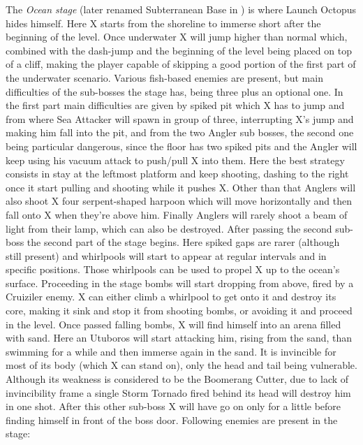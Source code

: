 The \textit{Ocean stage} (later renamed Subterranean Base in \mhx) is where Launch Octopus hides himself. Here X starts from the shoreline to immerse short after the beginning of the level. Once underwater X will jump higher than normal which, combined with the dash-jump and the beginning of the level being placed on top of a cliff, making the player capable of skipping a good portion of the first part of the underwater scenario\cite{stratwiki:Ocean}. Various fish-based enemies are present, but main difficulties of the sub-bosses the stage has, being three plus an optional one. In the first part main difficulties are given by spiked pit which X has to jump and from where Sea Attacker will spawn in group of three, interrupting X's jump and making him fall into the pit, and from the two Angler sub bosses, the second one being particular dangerous, since the floor has two spiked pits and the Angler will keep using his vacuum attack to push/pull X into them. Here the best strategy consists in stay at the leftmost platform and keep shooting, dashing to the right once it start pulling and shooting while it pushes X. Other than that Anglers will also shoot X four serpent-shaped harpoon which will move horizontally and then fall onto X when they're above him. Finally Anglers will rarely shoot a beam of light from their lamp, which can also be destroyed. After passing the second sub-boss the second part of the stage begins. Here spiked gaps are rarer (although still present) and whirlpools will start to appear at regular intervals and in specific positions. Those whirlpools can be used to propel X up to the ocean's surface. Proceeding in the stage bombs will start dropping from above, fired by a Cruiziler enemy. X can either climb a whirlpool to get onto it and destroy its core, making it sink and stop it from shooting bombs, or avoiding it and proceed in the level. Once passed falling bombs, X will find himself into an arena filled with sand. Here an Utuboros will start attacking him, rising from the sand, than swimming for a while and then immerse again in the sand. It is invincible for most of its body (which X can stand on), only the head and tail being vulnerable. Although its weakness is considered to be the Boomerang Cutter, due to lack of invincibility frame a single Storm Tornado fired behind its head will destroy him in one shot\cite{wiki:Utuboros}. After this other sub-boss X will have go on only for a little before finding himself in front of the boss door.
Following enemies are present in the stage\cite{wiki:Ocean}:
